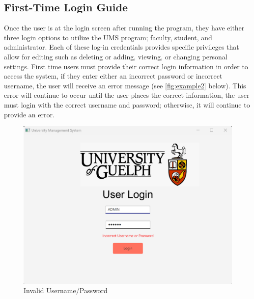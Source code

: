 \subsection{First-Time Login Guide}

Once the user is at the login screen after running the program, they have either three login options to utilize the UMS program; faculty, student, and administrator. Each of these log-in credentials provides specific privileges that allow for editing such as deleting or adding, viewing, or changing personal settings. First time users must provide their correct login information in order to access the system, if they enter either an incorrect password or incorrect username, the user will receive an error message (see \autoref{fig:example2} below). This error will continue to occur until the user places the correct information, the user must login with the correct username and password; otherwise, it will continue to provide an error.


\begin{figure}[ht]
    \centering
        \centering\includegraphics[width=1\linewidth]{figures/Incorrect_PW.png}
        \caption{Invalid Username/Password}
        \label{fig:example2}  
\end{figure}